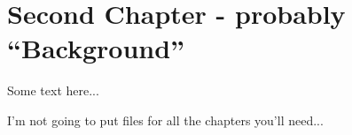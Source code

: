\chapter{Second Chapter - probably ``Background''}
\label{chap:chap2}


\cite{citizens-uk-2020}

Some text here...

I'm not going to put files for all the chapters you'll need...